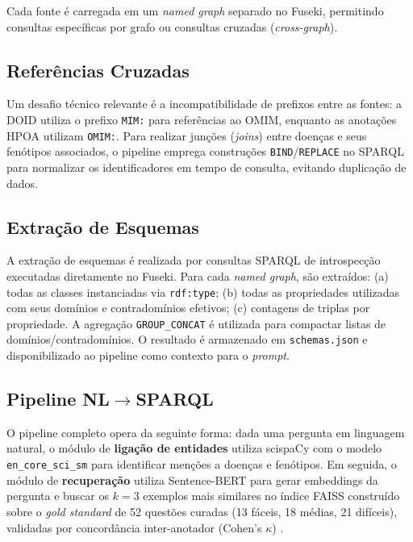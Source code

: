 \documentclass[12pt]{article}
\begin{document}
Cada fonte \'{e} carregada em um \textit{named graph} separado no Fuseki, permitindo consultas espec\'{i}ficas por grafo ou consultas cruzadas (\textit{cross-graph}).

\subsection{Refer\^{e}ncias Cruzadas}
\label{sec:crossref}

Um desafio t\'{e}cnico relevante \'{e} a incompatibilidade de prefixos entre as fontes: a DOID utiliza o prefixo \texttt{MIM:} para refer\^{e}ncias ao OMIM, enquanto as anota\c{c}\~{o}es HPOA utilizam \texttt{OMIM:}. Para realizar jun\c{c}\~{o}es (\textit{joins}) entre doen\c{c}as e seus fen\'{o}tipos associados, o pipeline emprega constru\c{c}\~{o}es \texttt{BIND}/\texttt{REPLACE} no SPARQL para normalizar os identificadores em tempo de consulta, evitando duplica\c{c}\~{a}o de dados.

\subsection{Extra\c{c}\~{a}o de Esquemas}
\label{sec:schemas}

A extra\c{c}\~{a}o de esquemas \'{e} realizada por consultas SPARQL de introspec\c{c}\~{a}o executadas diretamente no Fuseki. Para cada \textit{named graph}, s\~{a}o extra\'{i}dos: (a) todas as classes instanciadas via \texttt{rdf:type}; (b) todas as propriedades utilizadas com seus dom\'{i}nios e contradom\'{i}nios efetivos; (c) contagens de triplas por propriedade. A agrega\c{c}\~{a}o \texttt{GROUP\_CONCAT} \'{e} utilizada para compactar listas de dom\'{i}nios/contradom\'{i}nios. O resultado \'{e} armazenado em \texttt{schemas.json} e disponibilizado ao pipeline como contexto para o \textit{prompt}.

\subsection{Pipeline NL$\rightarrow$SPARQL}
\label{sec:pipeline}

O pipeline completo opera da seguinte forma: dada uma pergunta em linguagem natural, o m\'{o}dulo de \textbf{liga\c{c}\~{a}o de entidades} utiliza scispaCy \cite{neumann2019scispacy} com o modelo \texttt{en\_core\_sci\_sm} para identificar men\c{c}\~{o}es a doen\c{c}as e fen\'{o}tipos. Em seguida, o m\'{o}dulo de \textbf{recupera\c{c}\~{a}o} utiliza Sentence-BERT \cite{reimers2019sbert} para gerar embeddings da pergunta e buscar os $k=3$ exemplos mais similares no \'{i}ndice FAISS \cite{johnson2021faiss} constru\'{i}do sobre o \textit{gold standard} de 52 quest\~{o}es curadas (13 f\'{a}ceis, 18 m\'{e}dias, 21 dif\'{i}ceis), validadas por concord\^{a}ncia inter-anotador (Cohen's $\kappa$) \cite{cohen1960kappa}.
\end{document}
